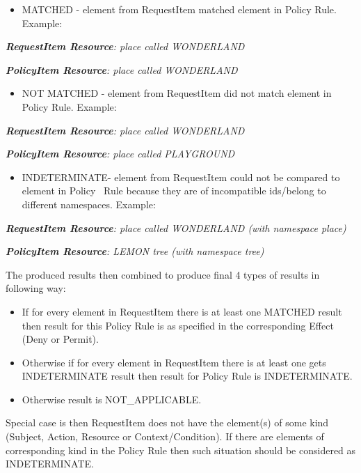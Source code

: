 \documentclass{article}
\newcommand\liststyleWWviiiNumxx{%
\renewcommand\theenumi{\arabic{enumi}}
\renewcommand\theenumii{\arabic{enumii}}
\renewcommand\theenumiii{\arabic{enumiii}}
\renewcommand\labelitemi{o}
\renewcommand\labelenumi{\theenumi.}
\renewcommand\labelenumii{\theenumii.}
\renewcommand\labelenumiii{\theenumiii.}
}
\begin{document}
\liststyleWWviiiNumxx
\begin{itemize}
\item {\color{black}
MATCHED - element from RequestItem matched element in Policy Rule.
Example:}
\end{itemize}
{\upshape\color{black}
\textbf{\textit{RequestItem Resource}}\textit{: place called
WONDERLAND}}

{\upshape\color{black}
\textbf{\textit{PolicyItem Resource}}\textit{: place called WONDERLAND}}

\liststyleWWviiiNumxx
\begin{itemize}
\item {\color{black}
NOT MATCHED - element from RequestItem did not match element in Policy
Rule. Example:}
\end{itemize}
{\upshape\color{black}
\textbf{\textit{RequestItem Resource}}\textit{: place called
WONDERLAND}}

{\upshape\color{black}
\textbf{\textit{PolicyItem Resource}}\textit{: place called PLAYGROUND}}

\liststyleWWviiiNumxx
\begin{itemize}
\item {\color{black}
INDETERMINATE- element from RequestItem could not be compared to element
in Policy \ Rule because they are of incompatible ids/belong to
different namespaces. Example:}
\end{itemize}
{\upshape\color{black}
\textbf{\textit{RequestItem Resource}}\textit{: place called WONDERLAND
(with namespace {\textquotedbl}place{\textquotedbl})}}

{\upshape\color{black}
\textbf{\textit{PolicyItem Resource}}\textit{: LEMON tree (with
namespace {\textquotedbl}tree{\textquotedbl})}}

{\color{black}
The produced results then combined to produce final 4 types of results
in following way:}

\liststyleWWviiiNumxx
\begin{itemize}
\item {\color{black}
If for every element in RequestItem there is at least one MATCHED result
then result for this Policy Rule is as specified in the corresponding
Effect (Deny or Permit).}
\item {\color{black}
Otherwise if for every element in RequestItem there is at least one gets
INDETERMINATE result then result for Policy Rule is INDETERMINATE.}
\item {\color{black}
Otherwise result is NOT\_APPLICABLE.}
\end{itemize}
{\color{black}
Special case is then RequestItem does not have the element(s) of some
kind (Subject, Action, Resource or Context/Condition). If there are
elements of corresponding kind in the Policy Rule then such situation
should be considered as INDETERMINATE.}
\end{document}
